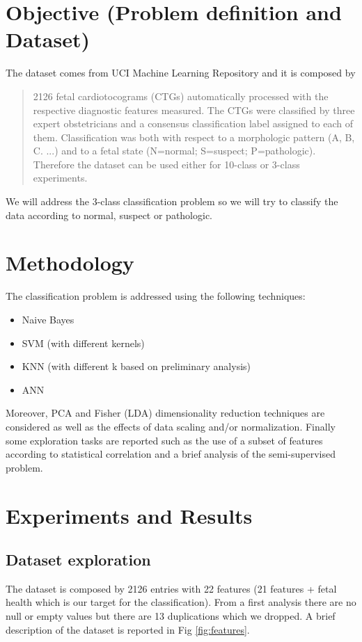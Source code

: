 \documentclass[a4paper,12pt]{article}
\begin{document}
\section{Objective (Problem definition and Dataset)}
The dataset comes from UCI Machine Learning Repository \cite{uci} and it is composed by 
\begin{quote}
2126 fetal cardiotocograms (CTGs) automatically processed with the respective diagnostic features measured. The CTGs were classified by three expert obstetricians and a consensus classification label assigned to each of them. Classification was both with respect to a morphologic pattern (A, B, C. ...) and to a fetal state (N=normal; S=suspect; P=pathologic). Therefore the dataset can be used either for 10-class or 3-class experiments.
\end{quote}
We will address the 3-class classification problem so we will try to classify the data according to normal, suspect or pathologic.

\section{Methodology}
The classification problem is addressed using the following techniques:

\begin{itemize}
  \item Naive Bayes \cite{ml}
  \item SVM (with different kernels) \cite{ml}
  \item KNN (with different k based on preliminary analysis) \cite{ml}
  \item ANN \cite{ann}
\end{itemize}
Moreover, PCA and Fisher (LDA) dimensionality reduction techniques are considered as well as the effects of data scaling and/or normalization. Finally some exploration tasks are reported such as the use of a subset of features according to statistical correlation and a brief analysis of the semi-supervised problem.
\section{Experiments and Results}
\subsection{Dataset exploration}
The dataset is composed by 2126 entries with 22 features (21 features + fetal health which is our target for the classification). From a first analysis there are no null or empty values but there are 13 duplications which we dropped. A brief description of the dataset is reported in Fig \ref{fig:features}.
\end{document}

